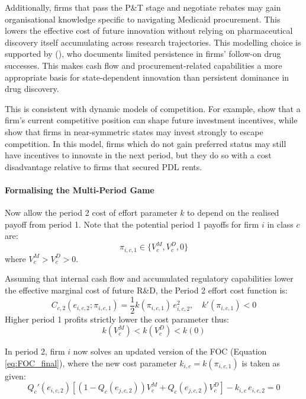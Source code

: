 \documentclass[12pt]{article}
\begin{document}
Additionally, firms that pass the P\&T stage and negotiate rebates may gain organisational knowledge specific to navigating Medicaid procurement. This lowers the effective cost of future innovation without relying on pharmaceutical discovery itself accumulating across research trajectories. This modelling choice is supported by \citeauthor{sutton1998technology} (\citeyear{sutton1998technology}), who documents limited persistence in firms' follow-on drug successes. This makes cash flow and procurement-related capabilities a more appropriate basis for state-dependent innovation than persistent dominance in drug discovery.

This is consistent with dynamic models of competition. For example, \cite{budd1993model} show that a firm's current competitive position can shape future investment incentives, while \cite{aghion2001competition} show that firms in near-symmetric states may invest strongly to escape competition. In this model, firms which do not gain preferred status may still have incentives to innovate in the next period, but they do so with a cost disadvantage relative to firms that secured PDL rents.

\paragraph{Formalising the Multi-Period Game} 
Now allow the period 2 cost of effort parameter $k$ to depend on the realised payoff from period 1. Note that the potential period 1 payoffs for firm $i$ in class $c$ are:
\begin{equation}
    \pi_{i,c,1} \in \{V_c^M, V_c^D, 0\}
\end{equation}
where $V_c^M > V_c^D > 0$. 

Assuming that internal cash flow and accumulated regulatory capabilities lower the effective marginal cost of future R\&D, the Period 2 effort cost function is:
\begin{equation}
    C_{c,2}(e_{i,c,2} ; \pi_{i,c,1}) = \frac{1}{2} k(\pi_{i,c,1}) \, e_{i,c,2}^2, \quad k'(\pi_{i,c,1}) < 0
\end{equation}
Higher period 1 profits strictly lower the cost parameter thus:
\begin{equation}
    k(V_c^M) < k(V_c^D) < k(0)
\end{equation}

In period 2, firm $i$ now solves an updated version of the FOC (Equation \ref{eq:FOC_final}), where the new cost parameter $k_{i,c} = k(\pi_{i,c,1})$ is taken as given:
\begin{equation} \label{eq:FOC_period2}
    Q_c'(e_{i,c,2}) \left[ (1-Q_c(e_{j,c,2})) V_c^M + Q_c(e_{j,c,2}) V_c^D \right] - k_{i,c} \, e_{i,c,2} = 0
\end{equation}
\end{document}
